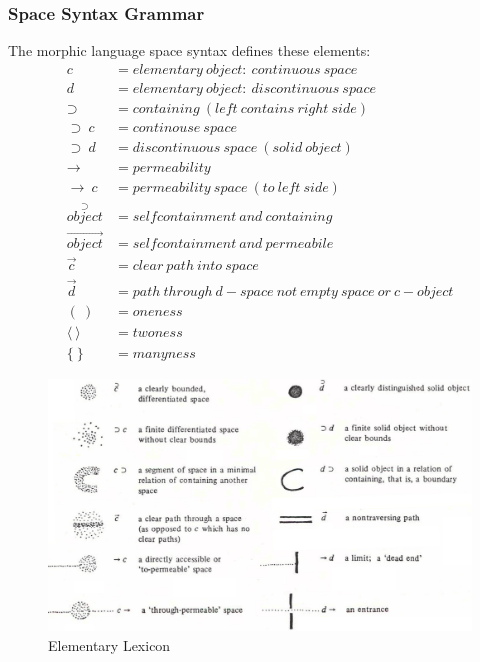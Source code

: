 \documentclass[11pt, a4paper]{report}
\begin{document}
\subsubsection{Space Syntax Grammar}
The morphic language space syntax defines these elements:
\begin{align}
    c &= elementary\ object:\ continuous\ space  \\
    d &= elementary\ object:\ discontinuous\ space  \\
    \supset &= containing\ (left\ contains\ right\ side)  \\
    \supset\ c &= continouse\ space  \\
    \supset\ d &= discontinuous\ space\ (solid\ object) \\
    \rightarrow &= permeability \\
    \rightarrow\ c &= permeability\ space\ (to\ left\ side) \\
    \overset{\supset}{object} &= selfcontainment\ and\ containing \\
    \overset{\rightarrow}{object} &= selfcontainment\ and\ permeabile \\
    \overset{\rightarrow}{c} &= clear\ path\ into\ space \\
    \overset{\rightarrow}{d} &= path\ through\ d-space\ not\ empty\ space\ or\ c-object \\
    (\ ) &= oneness \\
    \langle\ \rangle &= twoness \\
    \{\ \} &= manyness
\end{align}
\begin{figure}[!h]
    \centering
    \includegraphics[width=\textwidth]{spacesyntax_elementary.png}
    \caption{Elementary Lexicon\citep{spaceSyntax:1976}}\label{fig:Space Syntax/Elementary Lexicon}
\end{figure}
\end{document}
